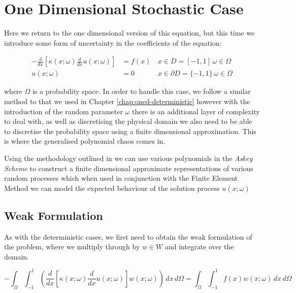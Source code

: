 \chapter{One Dimensional Stochastic Case}\label{chap:one-d-stochastic}

Here we return to the one dimensional version of this equation, but this time
we introduce some form of uncertainty in the coefficients of the equation:

\begin{equation}\label{eq:oned-stochastic}
  \begin{aligned}
      -\frac{d}{dx}\left[\kappa(x;\omega)\frac{d}{dx}u(x;\omega)\right] &= f(x)\,
                              &x \in  D = [-1,1]\, \omega \in \Omega \\
    u(x;\omega) &= 0 &x \in \partial D = \{-1,1\}\, \omega \in \Omega
  \end{aligned}
\end{equation}

where $\Omega$ is a probability space. In order to handle this case, we follow
a similar method to that we used in Chapter \ref{chap:oned-deterministic}
however with the introduction of the random parameter $\omega$ there is an
additional layer of complexity to deal with, as well as discretising the
physical domain we also need to be able to discretise the probability space
using a finite dimensional approximation.  This is where the generalised
polynomial chaos comes in.

Using the methodology outlined in \cite{general-poly-chaos} we can use various
polynomials in the \textit{Askey Scheme} to construct a finite dimensional
approximate representations of various random processes which when used in
conjunction with the Finite Element Method we can model the expected behaviour
of the solution process $u(x;\omega)$

\section{Weak Formulation}


As with the deterministic cases, we first need to obtain the weak formulation
of the problem, where we multiply through by $w \in W$ and integrate over the
domain.

\begin{equation}
    -\int_{\Omega}\int_{-1}^1\left(\frac{d}{dx}\left[\kappa(x;\omega)\frac{d}{dx}u(x;\omega)\right]
    w(x;\omega)\right)\, dx\, d\Omega = \int_{\Omega}\int_{-1}^1 f(x)w(x;\omega)\, dx\, d\Omega
\end{equation}

